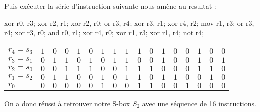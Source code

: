 \documentclass{article}
\begin{document}
Puis exécuter la série d'instruction suivante nous amène au resultat : 

xor r0, r3; xor r2, r1; xor r2, r0; or r3, r4; xor r3, r1; xor r4, r2; mov r1, r3; or r3, r4; xor r3, r0; and r0, r1; xor r4, r0; xor r1, r3; xor r1, r4; not r4;
\medbreak
\begin{center}
\begin{tabular}{|l|l|l|l|l|l|l|l|l|l|l|l|l|l|l|l|l|}
\hline
\multicolumn{1}{|l|}{$r_{4}=s_{3}$}&	\multicolumn{1}{|l|}{ $1$}&	\multicolumn{1}{|l|}{ $0$}&	\multicolumn{1}{|l|}{ $0$}&	\multicolumn{1}{|l|}{ $1$}&	\multicolumn{1}{|l|}{ $0$}&	\multicolumn{1}{|l|}{ $1$}&	\multicolumn{1}{|l|}{ $1$}&	\multicolumn{1}{|l|}{ $1$}&	\multicolumn{1}{|l|}{ $1$}&	\multicolumn{1}{|l|}{ $0$}&	\multicolumn{1}{|l|}{ $1$}&	\multicolumn{1}{|l|}{ $0$}&	\multicolumn{1}{|l|}{ $0$}&	\multicolumn{1}{|l|}{ $1$}&	\multicolumn{1}{|l|}{ $0$}&	\multicolumn{1}{|l|}{ $0$}	\\
\hline
\multicolumn{1}{|l|}{ $r_{3}=s_{1}$}&	\multicolumn{1}{|l|}{ $0$}&	\multicolumn{1}{|l|}{ $1$}&	\multicolumn{1}{|l|}{ $1$}&	\multicolumn{1}{|l|}{ $0$}&	\multicolumn{1}{|l|}{ $1$}&	\multicolumn{1}{|l|}{ $0$}&	\multicolumn{1}{|l|}{ $1$}&	\multicolumn{1}{|l|}{ $1$}&	\multicolumn{1}{|l|}{ $0$}&	\multicolumn{1}{|l|}{ $0$}&	\multicolumn{1}{|l|}{ $1$}&	\multicolumn{1}{|l|}{ $0$}&	\multicolumn{1}{|l|}{ $0$}&	\multicolumn{1}{|l|}{ $1$}&	\multicolumn{1}{|l|}{ $0$}&	\multicolumn{1}{|l|}{ $1$}	\\
\hline
\multicolumn{1}{|l|}{ $r_{2}=s_{0}$}&	\multicolumn{1}{|l|}{ $0$}&	\multicolumn{1}{|l|}{ $0$}&	\multicolumn{1}{|l|}{ $1$}&	\multicolumn{1}{|l|}{ $1$}&	\multicolumn{1}{|l|}{ $1$}&	\multicolumn{1}{|l|}{ $0$}&	\multicolumn{1}{|l|}{ $0$}&	\multicolumn{1}{|l|}{ $1$}&	\multicolumn{1}{|l|}{ $1$}&	\multicolumn{1}{|l|}{ $1$}&	\multicolumn{1}{|l|}{ $0$}&	\multicolumn{1}{|l|}{ $0$}&	\multicolumn{1}{|l|}{ $0$}&	\multicolumn{1}{|l|}{ $1$}&	\multicolumn{1}{|l|}{ $1$}&	\multicolumn{1}{|l|}{ $0$}	\\
\hline
\multicolumn{1}{|l|}{ $r_{1}=s_{2}$}&	\multicolumn{1}{|l|}{ $0$}&	\multicolumn{1}{|l|}{ $1$}&	\multicolumn{1}{|l|}{ $1$}&	\multicolumn{1}{|l|}{ $0$}&	\multicolumn{1}{|l|}{ $0$}&	\multicolumn{1}{|l|}{ $1$}&	\multicolumn{1}{|l|}{ $0$}&	\multicolumn{1}{|l|}{ $1$}&	\multicolumn{1}{|l|}{ $1$}&	\multicolumn{1}{|l|}{ $0$}&	\multicolumn{1}{|l|}{ $1$}&	\multicolumn{1}{|l|}{ $1$}&	\multicolumn{1}{|l|}{ $0$}&	\multicolumn{1}{|l|}{ $0$}&	\multicolumn{1}{|l|}{ $1$}&	\multicolumn{1}{|l|}{ $0$}	\\
\hline
\multicolumn{1}{|l|}{ $r_{0}$}&	\multicolumn{1}{|l|}{ $0$}&	\multicolumn{1}{|l|}{ $0$}&	\multicolumn{1}{|l|}{ $0$}&	\multicolumn{1}{|l|}{ $0$}&	\multicolumn{1}{|l|}{ $0$}&	\multicolumn{1}{|l|}{ $1$}&	\multicolumn{1}{|l|}{ $0$}&	\multicolumn{1}{|l|}{ $0$}&	\multicolumn{1}{|l|}{ $1$}&	\multicolumn{1}{|l|}{ $1$}&	\multicolumn{1}{|l|}{ $0$}&	\multicolumn{1}{|l|}{ $0$}&	\multicolumn{1}{|l|}{ $1$}&	\multicolumn{1}{|l|}{ $0$}&	\multicolumn{1}{|l|}{ $0$}&	\multicolumn{1}{|l|}{ $0$}	\\
\hline
\end{tabular}

\end{center}
\medbreak
On a donc réussi à retrouver notre S-box $S_{2}$ avec une séquence de 16 instructions. 
\end{document}
